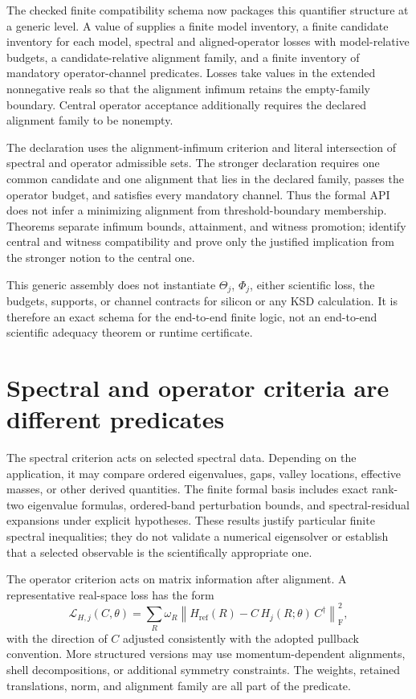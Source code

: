 The checked finite compatibility schema now packages this quantifier structure at a
generic level.  A value of
 supplies a finite model inventory, a finite candidate
inventory for each model, spectral and aligned-operator losses with model-relative
budgets, a candidate-relative alignment family, and a finite inventory of mandatory
operator-channel predicates.  Losses take values in the extended nonnegative reals so
that the alignment infimum retains the empty-family boundary.  Central operator
acceptance additionally requires the declared alignment family to be nonempty.

The declaration  uses the alignment-infimum criterion and literal
intersection of spectral and operator admissible sets.  The stronger declaration
 requires one common candidate and one alignment that lies in
the declared family, passes the operator budget, and satisfies every mandatory channel.
Thus the formal API does not infer a minimizing alignment from threshold-boundary
membership.  Theorems  separate infimum bounds,
attainment, and witness promotion;  identify central and
witness compatibility and prove only the justified implication from the stronger notion
to the central one.

This generic assembly does not instantiate $\Theta_j$, $\Phi_j$, either scientific loss,
the budgets, supports, or channel contracts for silicon or any KSD calculation.  It is
therefore an exact schema for the end-to-end finite logic, not an end-to-end scientific
adequacy theorem or runtime certificate.

\section{Spectral and operator criteria are different predicates}

The spectral criterion acts on selected spectral data.  Depending on the application,
it may compare ordered eigenvalues, gaps, valley locations, effective masses, or other
derived quantities.  The finite formal basis includes exact rank-two eigenvalue
formulas, ordered-band perturbation bounds, and spectral-residual expansions under
explicit hypotheses.  These results justify particular finite spectral inequalities;
they do not validate a numerical eigensolver or establish that a selected observable is
the scientifically appropriate one.

The operator criterion acts on matrix information after alignment.  A representative
real-space loss has the form
\[
  \mathcal L_{H,j}(C,\theta)
  =\sum_R\omega_R
    \left\|
      H_{\mathrm{ref}}(R)
      -C\,H_j(R;\theta)\,C^\dagger
    \right\|_{\mathrm F}^2,
\]
with the direction of $C$ adjusted consistently with the adopted pullback convention.
More structured versions may use momentum-dependent alignments, shell decompositions,
or additional symmetry constraints.  The weights, retained translations, norm, and
alignment family are all part of the predicate.

